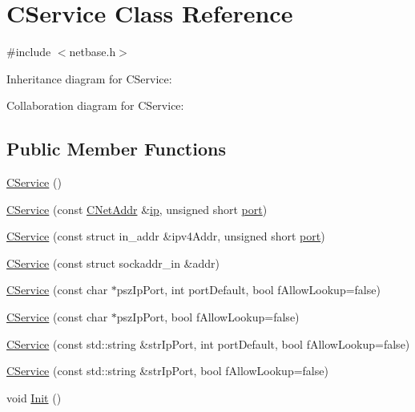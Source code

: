 \hypertarget{class_c_service}{}\section{C\+Service Class Reference}
\label{class_c_service}


{\ttfamily \#include $<$netbase.\+h$>$}



Inheritance diagram for C\+Service\+:


Collaboration diagram for C\+Service\+:
\subsection*{Public Member Functions}
\begin{DoxyCompactItemize}
\item 
\hyperlink{class_c_service_a3003da1c50f2135123ebb3109340b9b2}{C\+Service} ()
\item 
\hyperlink{class_c_service_a43a0d18387ce3837d48020da47a1087c}{C\+Service} (const \hyperlink{class_c_net_addr}{C\+Net\+Addr} \&\hyperlink{class_c_net_addr_acff7ce68f33f8dfbfe6d79d80928d417}{ip}, unsigned short \hyperlink{class_c_service_aef17734203dc2125cbdf4d23e50be410}{port})
\item 
\hyperlink{class_c_service_a1fcc14e589f6d3e92b43707a5f71368f}{C\+Service} (const struct in\+\_\+addr \&ipv4\+Addr, unsigned short \hyperlink{class_c_service_aef17734203dc2125cbdf4d23e50be410}{port})
\item 
\hyperlink{class_c_service_aa54fd9204530445647cd3d45056881e9}{C\+Service} (const struct sockaddr\+\_\+in \&addr)
\item 
\hyperlink{class_c_service_a75b2a3cfa16642b0fcd74382203a9fdc}{C\+Service} (const char $\ast$psz\+Ip\+Port, int port\+Default, bool f\+Allow\+Lookup=false)
\item 
\hyperlink{class_c_service_ab8f5f4ae4e99a4edad8ba48642e36137}{C\+Service} (const char $\ast$psz\+Ip\+Port, bool f\+Allow\+Lookup=false)
\item 
\hyperlink{class_c_service_a677f74b3520148f3e47a19bb9986922b}{C\+Service} (const std\+::string \&str\+Ip\+Port, int port\+Default, bool f\+Allow\+Lookup=false)
\item 
\hyperlink{class_c_service_a19a7a713dd9a30b2f78260e61d9a2604}{C\+Service} (const std\+::string \&str\+Ip\+Port, bool f\+Allow\+Lookup=false)
\item 
void \hyperlink{class_c_service_aee07d7f18e672f16d26359e3cab779ff}{Init} ()

\end{DoxyCompactItemize}
